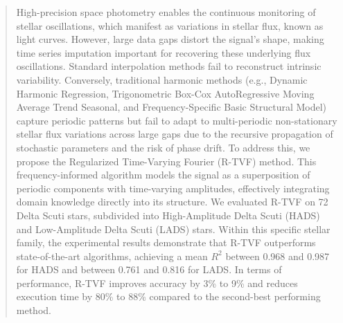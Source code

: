 \documentclass[a4paper,fleqn]{cas-sc}
\begin{document}
\begin{abstract}
High-precision space photometry enables the continuous monitoring of stellar oscillations, which manifest as variations in stellar flux, known as light curves. However, large data gaps distort the signal's shape, making time series imputation {\color{blue}important} for recovering these underlying flux oscillations. Standard interpolation methods fail to reconstruct intrinsic variability. Conversely, traditional harmonic methods (e.g., Dynamic Harmonic Regression, Trigonometric Box-Cox {\color{blue}AutoRegressive Moving Average} Trend Seasonal, and Frequency-Specific Basic Structural Model) capture periodic patterns but fail to adapt to multi-periodic non-stationary stellar flux variations across large gaps due to the recursive propagation of stochastic parameters and the risk of phase drift. To address this, we propose {\color{blue}the} Regularized Time-Varying Fourier (R-TVF) {\color{blue}method}. This frequency-informed algorithm models the signal as a superposition of periodic components with time-varying amplitudes, effectively integrating domain knowledge directly into its structure. We evaluated R-TVF on 72 Delta Scuti stars, subdivided into High-Amplitude Delta Scuti (HADS) and Low-Amplitude Delta Scuti (LADS) stars. Within this specific stellar family, the experimental results demonstrate that R-TVF outperforms state-of-the-art algorithms, achieving a mean $R^2$ between 0.968 and 0.987 for HADS and between 0.761 and 0.816 for LADS. In terms of performance, R-TVF improves accuracy by 3\% to 9\% and reduces execution time by 80\% to 88\% compared to the second-best performing {\color{blue}method}.
\end{abstract}



\end{document}
